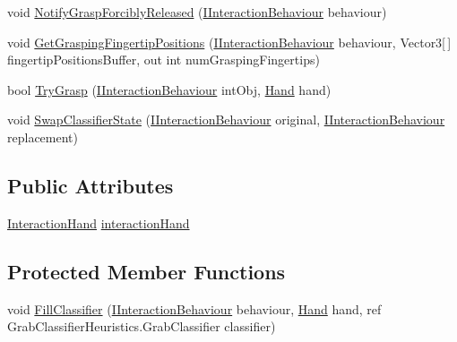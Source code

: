\begin{DoxyCompactItemize}
\item 
void \mbox{\hyperlink{class_leap_1_1_unity_1_1_interaction_1_1_internal_1_1_heuristic_grab_classifier_a9c2b9020038d2087dd78e9c4ccdbfcdb}{Notify\+Grasp\+Forcibly\+Released}} (\mbox{\hyperlink{interface_leap_1_1_unity_1_1_interaction_1_1_i_interaction_behaviour}{I\+Interaction\+Behaviour}} behaviour)
\item 
void \mbox{\hyperlink{class_leap_1_1_unity_1_1_interaction_1_1_internal_1_1_heuristic_grab_classifier_a54611fe455fec49241a629b7d9eea6c6}{Get\+Grasping\+Fingertip\+Positions}} (\mbox{\hyperlink{interface_leap_1_1_unity_1_1_interaction_1_1_i_interaction_behaviour}{I\+Interaction\+Behaviour}} behaviour, Vector3\mbox{[}$\,$\mbox{]} fingertip\+Positions\+Buffer, out int num\+Grasping\+Fingertips)
\item 
bool \mbox{\hyperlink{class_leap_1_1_unity_1_1_interaction_1_1_internal_1_1_heuristic_grab_classifier_a162bb92ee41f1376f650d3dd351aa2f0}{Try\+Grasp}} (\mbox{\hyperlink{interface_leap_1_1_unity_1_1_interaction_1_1_i_interaction_behaviour}{I\+Interaction\+Behaviour}} int\+Obj, \mbox{\hyperlink{class_leap_1_1_hand}{Hand}} hand)
\item 
void \mbox{\hyperlink{class_leap_1_1_unity_1_1_interaction_1_1_internal_1_1_heuristic_grab_classifier_a475f3bc02d1c3649d24ee266e2221c3b}{Swap\+Classifier\+State}} (\mbox{\hyperlink{interface_leap_1_1_unity_1_1_interaction_1_1_i_interaction_behaviour}{I\+Interaction\+Behaviour}} original, \mbox{\hyperlink{interface_leap_1_1_unity_1_1_interaction_1_1_i_interaction_behaviour}{I\+Interaction\+Behaviour}} replacement)
\end{DoxyCompactItemize}
\subsection*{Public Attributes}
\begin{DoxyCompactItemize}
\item 
\mbox{\hyperlink{class_leap_1_1_unity_1_1_interaction_1_1_interaction_hand}{Interaction\+Hand}} \mbox{\hyperlink{class_leap_1_1_unity_1_1_interaction_1_1_internal_1_1_heuristic_grab_classifier_a5448b1cba99694cc212019b370ba38ef}{interaction\+Hand}}
\end{DoxyCompactItemize}
\subsection*{Protected Member Functions}
\begin{DoxyCompactItemize}
\item 
void \mbox{\hyperlink{class_leap_1_1_unity_1_1_interaction_1_1_internal_1_1_heuristic_grab_classifier_a6a4380fb41761dd696eb549984b07e60}{Fill\+Classifier}} (\mbox{\hyperlink{interface_leap_1_1_unity_1_1_interaction_1_1_i_interaction_behaviour}{I\+Interaction\+Behaviour}} behaviour, \mbox{\hyperlink{class_leap_1_1_hand}{Hand}} hand, ref Grab\+Classifier\+Heuristics.\+Grab\+Classifier classifier)
\end{DoxyCompactItemize}


